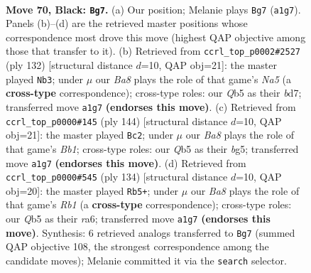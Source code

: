 \documentclass[11pt]{article}
\begin{document}
\clearpage

\begin{figure}[p]\centering
\begin{subfigure}{0.46\textwidth}\centering
\resizebox{\linewidth}{!}{%
\newchessgame
\chessboard[
  setfen={8/3Pkp2/8/1q6/8/7K/8/b7 b - - 4 70},
  showmover=false,
  pgfstyle=straightmove, color=movearrow, markmove={a1-g7}
]}
\caption{}
\end{subfigure}\hfill
\begin{subfigure}{0.46\textwidth}\centering
\resizebox{\linewidth}{!}{%
\newchessgame
\chessboard[
  setfen={5k2/3b4/5Pp1/N5K1/8/8/8/8 w - - 1 67},
  showmover=false,
  pgfstyle=straightmove, color=movearrow, markmove={a5-b3}
]}
\caption{}
\end{subfigure}
\\[4pt]
\begin{subfigure}{0.46\textwidth}\centering
\resizebox{\linewidth}{!}{%
\newchessgame
\chessboard[
  setfen={7k/8/8/6b1/6Pp/7K/8/1B6 w - - 9 73},
  showmover=false,
  pgfstyle=straightmove, color=movearrow, markmove={b1-c2}
]}
\caption{}
\end{subfigure}\hfill
\begin{subfigure}{0.46\textwidth}\centering
\resizebox{\linewidth}{!}{%
\newchessgame
\chessboard[
  setfen={8/8/r7/5k2/8/5pK1/5P2/1R6 w - - 2 68},
  showmover=false,
  pgfstyle=straightmove, color=movearrow, markmove={b1-b5}
]}
\caption{}
\end{subfigure}
\caption{\textbf{Move 70, Black: \texttt{Bg7}.} (a) Our position; Melanie plays \texttt{Bg7} (\texttt{a1g7}). Panels (b)--(d) are the retrieved master positions whose correspondence most drove this move (highest QAP objective among those that transfer to it). (b) Retrieved from \texttt{ccrl\_top\_p0002\#2527} (ply 132) [structural distance $d$=10, QAP obj=21]: the master played \texttt{Nb3}; under $\mu$ our \emph{Ba8} plays the role of that game's \emph{Na5} (a \textbf{cross-type} correspondence); cross-type roles: our \emph{Q}b5 as their \emph{b}d7; transferred move \texttt{a1g7} \textbf{(endorses this move)}. (c) Retrieved from \texttt{ccrl\_top\_p0000\#145} (ply 144) [structural distance $d$=10, QAP obj=21]: the master played \texttt{Bc2}; under $\mu$ our \emph{Ba8} plays the role of that game's \emph{Bb1}; cross-type roles: our \emph{Q}b5 as their \emph{b}g5; transferred move \texttt{a1g7} \textbf{(endorses this move)}. (d) Retrieved from \texttt{ccrl\_top\_p0000\#545} (ply 134) [structural distance $d$=10, QAP obj=20]: the master played \texttt{Rb5+}; under $\mu$ our \emph{Ba8} plays the role of that game's \emph{Rb1} (a \textbf{cross-type} correspondence); cross-type roles: our \emph{Q}b5 as their \emph{r}a6; transferred move \texttt{a1g7} \textbf{(endorses this move)}. Synthesis: 6 retrieved analogs transferred to \texttt{Bg7} (summed QAP objective 108, the strongest correspondence among the candidate moves); Melanie committed it via the \texttt{search} selector.}
\label{fig:thought-m139}
\end{figure}
\end{document}
